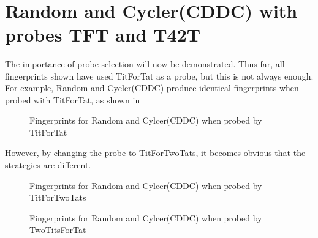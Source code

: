 \begin{figure}[htbp!]
\\
\end{figure}

\section{Random and Cycler(CDDC) with probes TFT and T42T}
The importance of probe selection will now be demonstrated.
Thus far, all fingerprints shown have used TitForTat as a probe, but this is not always enough.
For example, Random and Cycler(CDDC) produce identical fingerprints when probed with TitForTat, as shown in

\begin{figure}[htbp!]
    \centering
    \caption{Fingerprints for Random and Cylcer(CDDC) when probed by TitForTat}
    \label{fig:rand_cycle_tft}
\end{figure}

However, by changing the probe to TitForTwoTats, it becomes obvious that the strategies are different.

\begin{figure}[htbp!]
    \centering
    \caption{Fingerprints for Random and Cylcer(CDDC) when probed by TitForTwoTats}
    \label{fig:rand_cycle_tf2t}
\end{figure}

\begin{figure}[htbp!]
    \centering
    \caption{Fingerprints for Random and Cylcer(CDDC) when probed by TwoTitsForTat}
    \label{fig:rand_cycle_2tft}
\end{figure}

